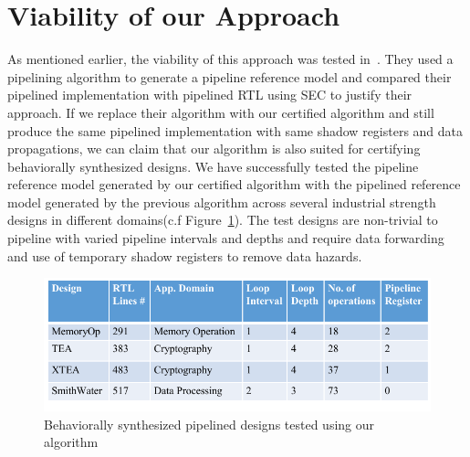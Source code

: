 \section{Viability of our Approach}
\label{sec:SEC}

As mentioned earlier, the viability of this approach was tested in~\cite{kechengthesis}. They used a pipelining algorithm to generate a pipeline reference model and compared their pipelined 
implementation with pipelined RTL using SEC to justify their approach. If we replace their algorithm with our certified algorithm and still produce the same pipelined implementation with same shadow registers and data propagations, we can claim that our algorithm is also suited for certifying behaviorally synthesized designs. We have successfully tested the pipeline reference model generated by our certified algorithm with the pipelined reference model generated by the previous algorithm across several industrial strength designs in different domains(c.f Figure~\ref{fig:testing}). The test designs are non-trivial to pipeline with varied pipeline intervals and depths and require data forwarding and use of temporary shadow registers to remove data hazards. 

\begin{figure}
\begin{center}
\includegraphics[width=5.5in]{fig-proposal/testing}
\end{center}
\caption{Behaviorally synthesized pipelined designs tested using our algorithm}
\label{fig:testing}
\end{figure}








